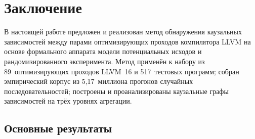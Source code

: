 \section{Заключение}

В настоящей работе предложен и реализован метод обнаружения каузальных зависимостей между парами оптимизирующих проходов компилятора LLVM на основе формального аппарата модели потенциальных исходов и рандомизированного эксперимента. Метод применён к набору из 89~оптимизирующих проходов LLVM~16 и 517~тестовых программ; собран эмпирический корпус из 5{,}17~миллиона прогонов случайных последовательностей; построены и проанализированы каузальные графы зависимостей на трёх уровнях агрегации.

\subsection*{Основные результаты}

